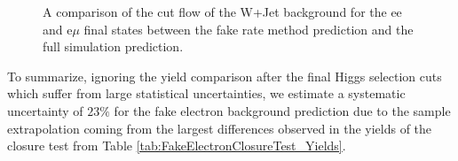 \begin{figure}[!htbp]
\begin{center}
\caption{A comparison of the cut flow of the W+Jet background for the ee and e$\mu$ final states
between the fake rate method prediction and the full simulation prediction. }
\label{fig:FakeElectronClosureTest_CutFlow}
\end{center}
\end{figure}

To summarize, ignoring the yield comparison after the final Higgs selection cuts which 
suffer from large statistical uncertainties, we estimate a systematic uncertainty of 
$23\%$ for the fake electron background prediction due to the sample extrapolation 
coming from the largest differences observed in the yields of the closure test from 
Table \ref{tab:FakeElectronClosureTest_Yields}. 


